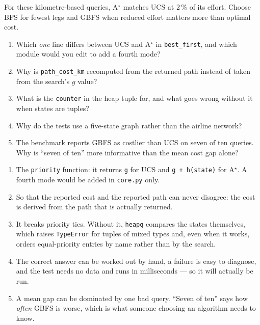 For these kilometre-based queries, A$^\star$ matches UCS at 2\,\% of its effort. Choose BFS for fewest legs and GBFS when reduced effort matters more than optimal cost.



\begin{quickcheck}
\begin{enumerate}
  \item Which \emph{one} line differs between UCS and A$^\star$ in \texttt{best\_first}, and which module would you edit to add a fourth mode?
  \item Why is \texttt{path\_cost\_km} recomputed from the returned path instead of taken from the search's $g$ value?
  \item What is the \texttt{counter} in the heap tuple for, and what goes wrong without it when states are tuples?
  \item Why do the tests use a five-state graph rather than the airline network?
  \item The benchmark reports GBFS as costlier than UCS on seven of ten queries. Why is ``seven of ten'' more informative than the mean cost gap alone?
\end{enumerate}
\end{quickcheck}

\begin{checkanswers}
\begin{enumerate}
  \item The \texttt{priority} function: it returns \texttt{g} for UCS and \texttt{g + h(state)} for A$^\star$. A fourth mode would be added in \texttt{core.py} only.
  \item So that the reported cost and the reported path can never disagree: the cost is derived from the path that is actually returned.
  \item It breaks priority ties. Without it, \texttt{heapq} compares the states themselves, which raises \texttt{TypeError} for tuples of mixed types and, even when it works, orders equal-priority entries by name rather than by the search.
  \item The correct answer can be worked out by hand, a failure is easy to diagnose, and the test needs no data and runs in milliseconds --- so it will actually be run.
  \item A mean gap can be dominated by one bad query. ``Seven of ten'' says how \emph{often} GBFS is worse, which is what someone choosing an algorithm needs to know.
\end{enumerate}
\end{checkanswers}
